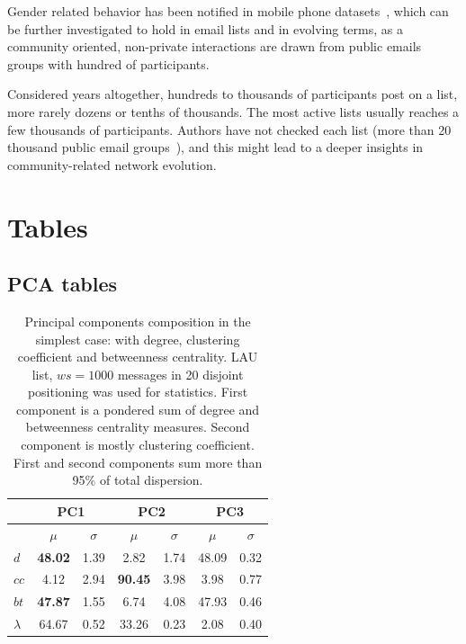 \documentclass[%
 aip,
 jmp,%
 amsmath,amssymb,
 reprint,%
]{revtex4-1}
\begin{document}
Gender related behavior has been notified in mobile phone datasets~\cite{barabasiSex}, which can be further investigated to hold in email lists and in evolving terms, as a community oriented, non-private interactions are drawn from public emails groups with hundred of participants. 

Considered years altogether, hundreds to thousands of participants post on a list, more rarely dozens or tenths of thousands. The most active lists usually reaches a few thousands of participants. Authors have not checked each list (more than 20 thousand public email groups~\cite{GMANE}), and this might lead to a deeper insights in community-related network evolution.




\section{Tables}\label{sectables}
\clearpage
\subsection{PCA tables}

\begin{table}[H]
  \centering
  \begin{tabular}{|l|c|c| c|c| c|c|}\hline
 & \multicolumn{2}{c|}{PC1}          & \multicolumn{2}{c|}{PC2} & \multicolumn{2}{c|}{PC3}  \\\hline
       & $\mu$            & $\sigma$ & $\mu$         & $\sigma$ & $\mu$ & $\sigma$  \\\hline
$d$       & {\bf 48.02}   & 1.39     & 2.82          & 1.74     & 48.09  & 0.32 \\
$cc$      & 4.12          & 2.94     & {\bf 90.45}   & 3.98     & 3.98  & 0.77 \\ 
$bt$      & {\bf 47.87}   & 1.55     & 6.74          & 4.08     & 47.93 & 0.46 \\ \hline
$\lambda$ & 64.67         & 0.52     & 33.26         & 0.23     & 2.08  & 0.40 \\ \hline
  \end{tabular}
  \caption{Principal components composition in the simplest case: with degree, clustering coefficient and betweenness centrality. LAU list, $ws=1000$ messages in 20 disjoint positioning was used for statistics. First component is a pondered sum of degree and betweenness centrality measures. Second component is mostly clustering coefficient. First and second components sum more than 95\% of total dispersion.}
  \label{compPCA0}
\end{table}
\end{document}
